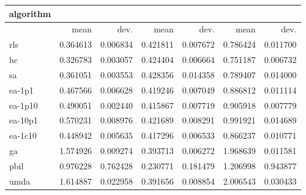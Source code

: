 \begin{tabular}{@{}l*{6}{>{{}}N{1}{2}}@{}}
\toprule
{algorithm} &  &  &  \\
\midrule
& {mean} & {dev.} & {mean} & {dev.} & {mean} & {dev.} \\
\midrule
rls & 0.364613 & 0.006834 & 0.421811 & 0.007672 & 0.786424 & 0.011700 \\
 hc & 0.326783 & 0.003057 & 0.424404 & 0.006664 & 0.751187 & 0.006732 \\
 sa & 0.361051 & 0.003553 & 0.428356 & 0.014358 & 0.789407 & 0.014000 \\
 ea-1p1 & 0.467566 & 0.006628 & 0.419246 & 0.007049 & 0.886812 & 0.011114 \\
 ea-1p10 & 0.490051 & 0.002440 & 0.415867 & 0.007719 & 0.905918 & 0.007779 \\
 ea-10p1 & 0.570231 & 0.008976 & 0.421689 & 0.008291 & 0.991921 & 0.014689 \\
 ea-1c10 & 0.448942 & 0.005635 & 0.417296 & 0.006533 & 0.866237 & 0.010771 \\
 ga & 1.574926 & 0.009274 & 0.393713 & 0.006272 & 1.968639 & 0.011581 \\
 pbil & 0.976228 & 0.762428 & 0.230771 & 0.181479 & 1.206998 & 0.943877 \\
 umda & 1.614887 & 0.022958 & 0.391656 & 0.008854 & 2.006543 & 0.030433 \\
 \bottomrule
\end{tabular}
